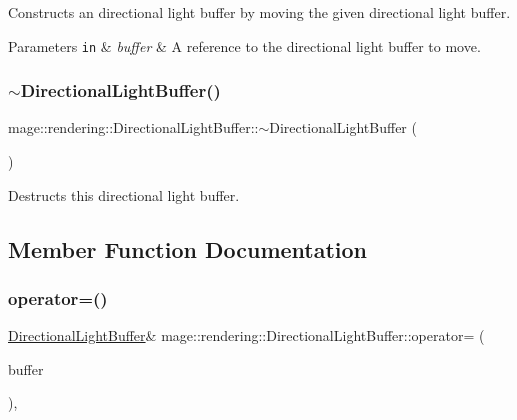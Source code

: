 Constructs an directional light buffer by moving the given directional light buffer.


\begin{DoxyParams}[1]{Parameters}
\mbox{\tt in}  & {\em buffer} & A reference to the directional light buffer to move. \\
\hline
\end{DoxyParams}
\hypertarget{structmage_1_1rendering_1_1_directional_light_buffer_ac52791a07948b17670c13b4aa0ddb104}{}\label{structmage_1_1rendering_1_1_directional_light_buffer_ac52791a07948b17670c13b4aa0ddb104} 
\subsubsection{\texorpdfstring{$\sim$\+Directional\+Light\+Buffer()}{~DirectionalLightBuffer()}}
{\footnotesize\ttfamily mage\+::rendering\+::\+Directional\+Light\+Buffer\+::$\sim$\+Directional\+Light\+Buffer (\begin{DoxyParamCaption}{ }\end{DoxyParamCaption})\hspace{0.3cm}{\ttfamily [default]}}

Destructs this directional light buffer. 

\subsection{Member Function Documentation}
\hypertarget{structmage_1_1rendering_1_1_directional_light_buffer_ae2dfc882b678be7ae81b6d51b55f74bc}{}\label{structmage_1_1rendering_1_1_directional_light_buffer_ae2dfc882b678be7ae81b6d51b55f74bc} 
\subsubsection{\texorpdfstring{operator=()}{operator=()}\hspace{0.1cm}{\footnotesize\ttfamily [1/2]}}
{\footnotesize\ttfamily \hyperlink{structmage_1_1rendering_1_1_directional_light_buffer}{Directional\+Light\+Buffer}\& mage\+::rendering\+::\+Directional\+Light\+Buffer\+::operator= (\begin{DoxyParamCaption}\item[{const \hyperlink{structmage_1_1rendering_1_1_directional_light_buffer}{Directional\+Light\+Buffer} \&}]{buffer }\end{DoxyParamCaption})\hspace{0.3cm}{\ttfamily [default]}, {\ttfamily [noexcept]}}

